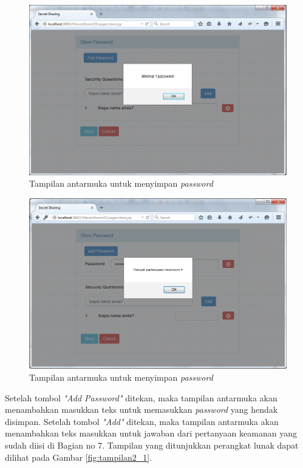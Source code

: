 \begin{figure}[H]
	\includegraphics[scale=0.5]{Gambar/tampilan2_2}
	\centering
	\caption{Tampilan antarmuka untuk menyimpan \textit{password}}\label{fig:tampilan2_2}
\end{figure}

\begin{figure}[H]
	\includegraphics[scale=0.5]{Gambar/tampilan2_3}
	\centering
	\caption{Tampilan antarmuka untuk menyimpan \textit{password}}\label{fig:tampilan2_3}
\end{figure}

Setelah tombol \textit{"Add Password"} ditekan, maka tampilan antarmuka akan menambahkan masukkan teks untuk memasukkan \textit{password} yang hendak disimpan. Setelah tombol \textit{"Add"} ditekan, maka tampilan antarmuka akan menambahkan teks masukkan untuk jawaban dari pertanyaan keamanan yang sudah diisi di Bagian no 7. Tampilan yang ditunjukkan perangkat lunak dapat dilihat pada Gambar \ref{fig:tampilan2_1}.

